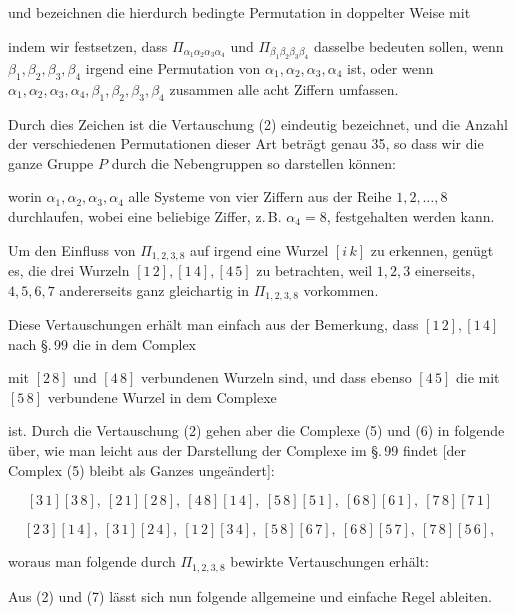 und bezeichnen die hierdurch bedingte Permutation in doppelter Weise mit


indem wir festsetzen, dass $\Pi_{\alpha_1\alpha_2\alpha_3\alpha_4}$ und $\Pi_{\beta_1\beta_2\beta_3\beta_4}$ dasselbe bedeuten sollen, wenn $\beta_1,\beta_2,\beta_3,\beta_4$ irgend eine Permutation von $\alpha_1,\alpha_2,\alpha_3,\alpha_4$ ist, oder wenn $\alpha_1,\alpha_2,\alpha_3,\alpha_4,\beta_1,\beta_2,\beta_3,\beta_4$ zusammen alle acht Ziffern umfassen.

Durch dies Zeichen ist die Vertauschung (2) eindeutig bezeichnet, und die Anzahl der verschiedenen Permutationen dieser Art beträgt genau 35, so dass wir die ganze Gruppe $P$ durch die Nebengruppen so darstellen können:


worin $\alpha_1,\alpha_2,\alpha_3,\alpha_4$ alle Systeme von vier Ziffern aus der Reihe $1,2,\dots,8$ durchlaufen, wobei eine beliebige Ziffer, z.\,B. $\alpha_4 = 8$, festgehalten werden kann.

Um den Einfluss von $\Pi_{1,2,3,8}$ auf irgend eine Wurzel $[i\,k]$ zu erkennen, genügt es, die drei Wurzeln $[1\,2], [1\,4], [4\,5]$ zu betrachten, weil $1,2,3$ einerseits, $4,5,6,7$ andererseits ganz gleichartig in $\Pi_{1,2,3,8}$ vorkommen.

Diese Vertauschungen erhält man einfach aus der Bemerkung, dass $[1\,2], [1\,4]$ nach \S.\,99 die in dem Complex


mit $[2\,8]$ und $[4\,8]$ verbundenen Wurzeln sind, und dass ebenso $[4\,5]$ die mit $[5\,8]$ verbundene Wurzel in dem Complexe


ist. Durch die Vertauschung (2) gehen aber die Complexe (5) und (6) in folgende über, wie man leicht aus der Darstellung der Complexe im \S.\,99 findet [der Complex (5) bleibt als Ganzes ungeändert]:

\[
[3\,1][3\,8],\ [2\,1][2\,8],\ [4\,8][1\,4],\ [5\,8][5\,1],\ [6\,8][6\,1],\ [7\,8][7\,1]
\]

\[
[2\,3][1\,4],\ [3\,1][2\,4],\ [1\,2][3\,4],\ [5\,8][6\,7],\ [6\,8][5\,7],\ [7\,8][5\,6],
\]

woraus man folgende durch $\Pi_{1,2,3,8}$ bewirkte Vertauschungen erhält:


Aus (2) und (7) lässt sich nun folgende allgemeine und einfache Regel ableiten.

